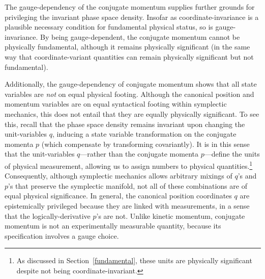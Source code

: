 \documentclass[letterpaper]{article}
\begin{document}
The gauge-dependency of the conjugate momentum supplies further grounds for privileging the invariant phase space density. Insofar as coordinate-invariance is a plausible necessary condition for fundamental physical status, so is gauge-invariance. By being gauge-dependent, the conjugate momentum cannot be physically fundamental, although it remains physically significant (in the same way that coordinate-variant quantities can remain physically significant but not fundamental).

Additionally, the gauge-dependency of conjugate momentum shows that all state variables are \textit{not} on equal physical footing. Although the canonical position and momentum variables are on equal syntactical footing within symplectic mechanics, this does not entail that they are equally physically significant. To see this, recall that the phase space density remains invariant upon changing the unit-variables $q$, inducing a state variable transformation on the conjugate momenta $p$ (which compensate by transforming covariantly). It is in this sense that the unit-variables $q$---rather than the conjugate momenta $p$---define the units of physical measurement, allowing us to assign numbers to physical quantities.\footnote{As discussed in Section~\ref{fundamental}, these units are physically significant despite not being coordinate-invariant.} Consequently, although symplectic mechanics allows arbitrary mixings of $q$'s and $p$'s that preserve the symplectic manifold, not all of these combinations are of equal physical significance. In general, the canonical position coordinates $q$ are epistemically privileged because they are linked with measurements, in a sense that the logically-derivative $p$'s are not. Unlike kinetic momentum, conjugate momentum is not an experimentally measurable quantity, because its specification involves a gauge choice.




\end{document}
